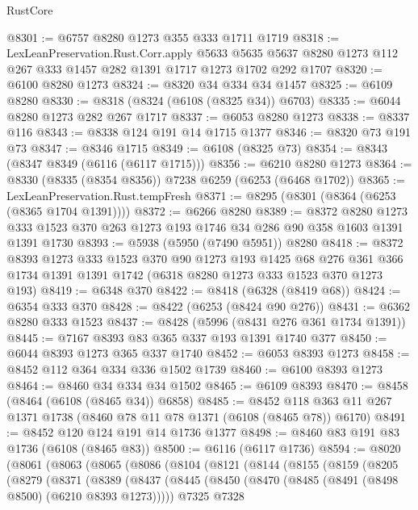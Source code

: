 \begin{lexlean}{RustCore}
\begin{coremodule}
@8301 := @6757 @8280 @1273 @355 @333 @1711 @1719
@8318 := LexLeanPreservation.Rust.Corr.apply
    @5633
    @5635
    @5637
    @8280
    @1273
    @112
    @267
    @333
    @1457
    @282
    @1391
    @1717
    @1273
    @1702
    @292
    @1707
@8320 := @6100 @8280 @1273
@8324 := @8320 @34 @334 @34 @1457
@8325 := @6109 @8280
@8330 := @8318 (@8324 (@6108 (@8325 @34)) @6703)
@8335 := @6044 @8280 @1273 @282 @267 @1717
@8337 := @6053 @8280 @1273
@8338 := @8337 @116
@8343 := @8338 @124 @191 @14 @1715 @1377
@8346 := @8320 @73 @191 @73
@8347 := @8346 @1715
@8349 := @6108 (@8325 @73)
@8354 := @8343 (@8347 @8349 (@6116 (@6117 @1715)))
@8356 := @6210 @8280 @1273
@8364 := @8330 (@8335 (@8354 @8356)) @7238 @6259 (@6253 (@6468 @1702))
@8365 := LexLeanPreservation.Rust.tempFresh
@8371 := @8295 (@8301 (@8364 (@6253 (@8365 @1704 @1391))))
@8372 := @6266 @8280
@8389 := @8372
    @8280
    @1273
    @333
    @1523
    @370
    @263
    @1273
    @193
    @1746
    @34
    @286
    @90
    @358
    @1603
    @1391
    @1391
    @1730
@8393 := @5938 (@5950 (@7490 @5951)) @8280
@8418 := @8372
    @8393
    @1273
    @333
    @1523
    @370
    @90
    @1273
    @193
    @1425
    @68
    @276
    @361
    @366
    @1734
    @1391
    @1391
    @1742
    (@6318 @8280 @1273 @333 @1523 @370 @1273 @193)
@8419 := @6348 @370
@8422 := @8418 (@6328 (@8419 @68))
@8424 := @6354 @333 @370
@8428 := @8422 (@6253 (@8424 @90 @276))
@8431 := @6362 @8280 @333 @1523
@8437 := @8428 (@5996 (@8431 @276 @361 @1734 @1391))
@8445 := @7167 @8393 @83 @365 @337 @193 @1391 @1740 @377
@8450 := @6044 @8393 @1273 @365 @337 @1740
@8452 := @6053 @8393 @1273
@8458 := @8452 @112 @364 @334 @336 @1502 @1739
@8460 := @6100 @8393 @1273
@8464 := @8460 @34 @334 @34 @1502
@8465 := @6109 @8393
@8470 := @8458 (@8464 (@6108 (@8465 @34)) @6858)
@8485 := @8452 @118 @363 @11 @267 @1371 @1738 (@8460 @78 @11 @78 @1371 (@6108 (@8465 @78)) @6170)
@8491 := @8452 @120 @124 @191 @14 @1736 @1377
@8498 := @8460 @83 @191 @83 @1736 (@6108 (@8465 @83))
@8500 := @6116 (@6117 @1736)
@8594 := @8020
    (@8061
      (@8063
        (@8065
          (@8086
            (@8104
              (@8121
                (@8144
                  (@8155
                    (@8159
                      (@8205
                        (@8279
                          (@8371
                            (@8389
                              (@8437
                                (@8445
                                  (@8450 (@8470 (@8485 (@8491 (@8498 @8500) (@6210 @8393 @1273)))))
                                  @7325
                                  @7328

\end{coremodule}
\end{lexlean}
